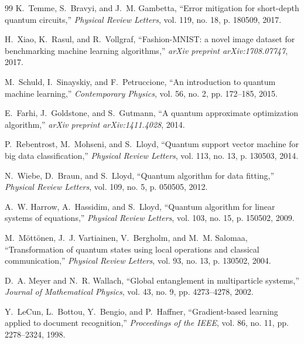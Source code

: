 \documentclass[journal]{IEEEtran}
\begin{document}
\begin{thebibliography}{99}
K.~Temme, S.~Bravyi, and J.~M. Gambetta,
``Error mitigation for short-depth quantum circuits,'' \emph{Physical Review Letters}, vol. 119, no. 18, p. 180509, 2017.

H.~Xiao, K.~Rasul, and R.~Vollgraf,
``Fashion-MNIST: a novel image dataset for benchmarking machine learning algorithms,'' \emph{arXiv preprint arXiv:1708.07747}, 2017.

M.~Schuld, I.~Sinayskiy, and F.~Petruccione,
``An introduction to quantum machine learning,'' \emph{Contemporary Physics}, vol. 56, no. 2, pp. 172--185, 2015.

E.~Farhi, J.~Goldstone, and S.~Gutmann,
``A quantum approximate optimization algorithm,'' \emph{arXiv preprint arXiv:1411.4028}, 2014.

P.~Rebentrost, M.~Mohseni, and S.~Lloyd,
``Quantum support vector machine for big data classification,'' \emph{Physical Review Letters}, vol. 113, no. 13, p. 130503, 2014.

N.~Wiebe, D.~Braun, and S.~Lloyd,
``Quantum algorithm for data fitting,'' \emph{Physical Review Letters}, vol. 109, no. 5, p. 050505, 2012.

A.~W. Harrow, A.~Hassidim, and S.~Lloyd,
``Quantum algorithm for linear systems of equations,'' \emph{Physical Review Letters}, vol. 103, no. 15, p. 150502, 2009.

M.~M{\"o}tt{\"o}nen, J.~J. Vartiainen, V.~Bergholm, and M.~M. Salomaa,
``Transformation of quantum states using local operations and classical communication,'' \emph{Physical Review Letters}, vol. 93, no. 13, p. 130502, 2004.

D.~A. Meyer and N.~R. Wallach,
``Global entanglement in multiparticle systems,'' \emph{Journal of Mathematical Physics}, vol. 43, no. 9, pp. 4273--4278, 2002.

Y.~LeCun, L.~Bottou, Y.~Bengio, and P.~Haffner,
``Gradient-based learning applied to document recognition,'' \emph{Proceedings of the IEEE}, vol. 86, no. 11, pp. 2278--2324, 1998.

\end{thebibliography}
\end{document}
